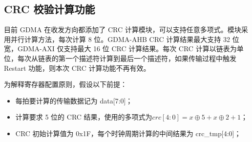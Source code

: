 \documentclass[main\_\_CN.tex]{subfiles}
\begin{document}
\subsection{CRC 校验计算功能}\label{sec:dma-crc-func}

目前 GDMA 在收发方向都添加了 CRC 计算模块，可以支持任意多项式。模块采用并行计算方法，每次计算 8 位。GDMA-AHB CRC 计算结果最大支持 32 位宽，GDMA-AXI 仅支持最大 16 位 CRC 计算结果。每次 CRC 计算以链表为单位，每次从链表的第一个描述符计算到最后一个描述符，如果传输过程中触发 Restart 功能，则本次 CRC 计算功能不再有效。

为解释寄存器配置原则，假设以下前提：
\begin{itemize}
\item 每拍要计算的传输数据记为 data[7:0]；
\item 计算要求 5 位的 CRC 结果，使用的多项式为\(crc[4:0] = x \oplus 5+ x \oplus 2 +1\)；
\item CRC 初始计算值为 0x1F，每个时钟周期计算的中间结果为 crc\_tmp[4:0]；
\end{itemize}
\end{document}
